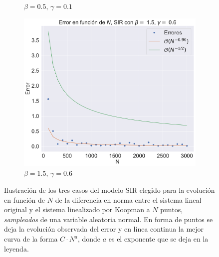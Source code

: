 \begin{figure}[h]
\begin{subfigure}[b]{0.32\textwidth}
        \caption{$\beta=0.5$, $\gamma=0.1$}
    \end{subfigure}
    \hfill
    \begin{subfigure}[b]{0.32\textwidth}
        \centering
        \includegraphics[width=\textwidth]{img/content/chapter3/SIR3Errors.pdf}
        \caption{$\beta=1.5$, $\gamma=0.6$}
    \end{subfigure}
    \caption{Ilustración de los tres casos del modelo SIR elegido para la evolución en función de $N$ de la diferencia en norma entre el sistema lineal original y el sistema linealizado por Koopman a $N$ puntos,  \textit{sampleados} de una variable aleatoria normal. En forma de puntos se deja la evolución observada del error y en línea continua la mejor curva de la forma $C \cdot N^{a}$, donde $a$ es el exponente que se deja en la leyenda.}
    \label{fig:ErrorSIR}
\end{figure}

